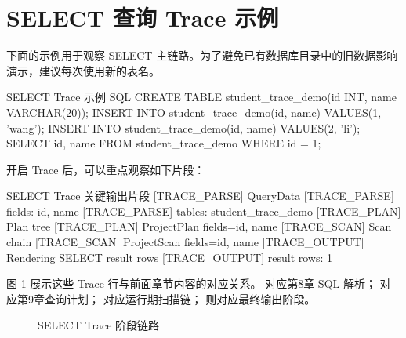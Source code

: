 \section{SELECT 查询 Trace 示例}
\label{sec:trace-select}

下面的示例用于观察 SELECT 主链路。为了避免已有数据库目录中的旧数据影响演示，建议每次使用新的表名。

\begin{dbcode}[listing options={language=SQL}]{SELECT Trace 示例 SQL}
CREATE TABLE student_trace_demo(id INT, name VARCHAR(20));
INSERT INTO student_trace_demo(id, name) VALUES(1, 'wang');
INSERT INTO student_trace_demo(id, name) VALUES(2, 'li');
SELECT id, name FROM student_trace_demo WHERE id = 1;
\end{dbcode}

开启 Trace 后，可以重点观察如下片段：

\begin{dbcode}{SELECT Trace 关键输出片段}
[TRACE_PARSE] QueryData
[TRACE_PARSE]   fields: id, name
[TRACE_PARSE]   tables: student_trace_demo
[TRACE_PLAN] Plan tree
[TRACE_PLAN]   ProjectPlan fields=id, name
[TRACE_SCAN] Scan chain
[TRACE_SCAN]   ProjectScan fields=id, name
[TRACE_OUTPUT] Rendering SELECT result rows
[TRACE_OUTPUT] result rows: 1
\end{dbcode}

图 \ref{fig:trace-select-flow} 展示这些 Trace 行与前面章节内容的对应关系。 对应第8章 SQL 解析； 对应第9章查询计划； 对应运行期扫描链； 则对应最终输出阶段。

\begin{figure}[htbp]
  \centering
  \caption{SELECT Trace 阶段链路}
  \label{fig:trace-select-flow}
\end{figure}

